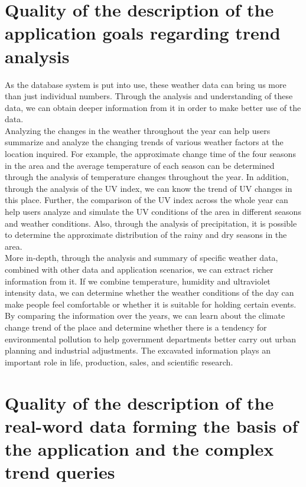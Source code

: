 \documentclass[]{article}
\begin{document}
\section{Quality of the description of the application goals regarding trend analysis}

	As the database system is put into use, these weather data can bring us more than just individual numbers. Through the analysis and understanding of these data, we can obtain deeper information from it in order to make better use of the data. \\
	
	\noindent Analyzing the changes in the weather throughout the year can help users summarize and analyze the changing trends of various weather factors at the location inquired. For example, the approximate change time of the four seasons in the area and the average temperature of each season can be determined through the analysis of temperature changes throughout the year. In addition, through the analysis of the UV index, we can know the trend of UV changes in this place. Further, the comparison of the UV index across the whole year can help users analyze and simulate the UV conditions of the area in different seasons and weather conditions. Also, through the analysis of precipitation, it is possible to determine the approximate distribution of the rainy and dry seasons in the area. \\
	
	\noindent More in-depth, through the analysis and summary of specific weather data, combined with other data and application scenarios, we can extract richer information from it. If we combine temperature, humidity and ultraviolet intensity data, we can determine whether the weather conditions of the day can make people feel comfortable or whether it is suitable for holding certain events. By comparing the information over the years, we can learn about the climate change trend of the place and determine whether there is a tendency for environmental pollution to help government departments better carry out urban planning and industrial adjustments. The excavated information plays an important role in life, production, sales, and scientific research.
	
\section{Quality of the description of the real-word data forming the basis of the application and the complex trend queries}
\end{document}
